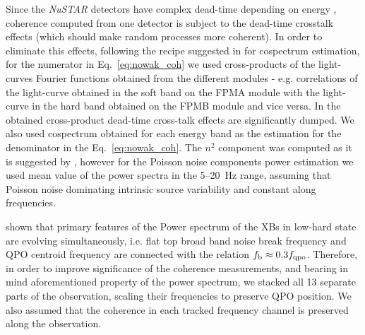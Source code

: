 \documentclass[a4paper,fleqn,usenatbib]{mnras}
\begin{document}
Since the {\it NuSTAR} detectors have complex dead-time depending on energy \citep[see ][for a details on how this affects power spectra]{2015ApJ...800..109B}, coherence computed from one detector is subject to the dead-time crosstalk effects (which should make random processes more coherent).
In order to eliminate this effects, following the recipe suggested in \cite{2015ApJ...800..109B} for cospectrum estimation, for the numerator in Eq.~\ref{eq:nowak_coh} we used cross-products of the light-curves Fourier functions obtained from the different modules - e.g. correlations of the light-curve obtained in the soft band on the FPMA module with the light-curve in the hard band obtained on the FPMB module and vice versa.
In the obtained cross-product dead-time cross-talk effects are significantly dumped.
We also used cospectrum obtained for each energy band as the estimation for the denominator in the Eq.~\ref{eq:nowak_coh}.
The $n^2$ component was computed as it is suggested by \citet{1997ApJ...474L..43V}, however for the Poisson noise components power estimation we used mean value of the power spectra in the 5--20~Hz range, assuming that Poisson noise dominating intrinsic source variability and constant along frequencies. 

\citet{wijnands99} shown that primary features of the Power spectrum of the XBs in low-hard state are evolving simultaneously, i.e. flat top broad band noise break frequency and QPO centroid frequency are connected with the relation $f_{\rm b} \approx 0.3 f_{\rm qpo}$.
Therefore, in order to improve significance of the coherence measurements, and bearing in mind aforementioned property of the power spectrum, we stacked all 13 separate parts of the observation, scaling their frequencies to preserve QPO position. 
We also assumed that the coherence in each tracked frequency channel is preserved along the observation. 
\end{document}

